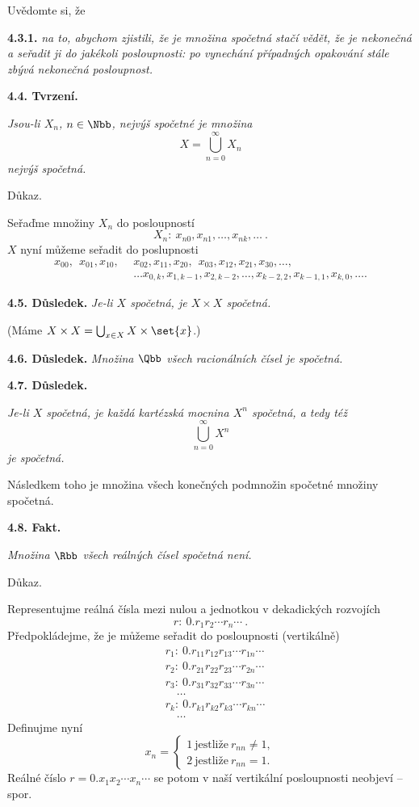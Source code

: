 \documentclass[12pt]{article}
\begin{document}
Uvědomte si, že
 
 {\bf 4.3.1.} {\em na to, abychom zjistili, že je množina spočetná stačí vědět, že je nekonečná a seřadit ji do jakékoli posloupnosti: po vynechání případných opakování stále zbývá nekonečná posloupnost.}
 
 \bigskip
 
 {\bf 4.4. Tvrzení.} {\em  Jsou-li $X_n$, $n\in\Nbb$, nejvýš spočetné je množina
 $$
 X=\bigcup_{n=0}^\infty X_n
 $$
nejvýš spočetná.
 
 Důkaz.} Seřaďme množiny $X_n$ do posloupností
 $$
 X_n: \ x_{n0},x_{n1},\dots,x_{nk},\dots \ .
 $$
$X$ nyní můžeme seřadit do poslupnosti
 $$
 \begin{aligned} x_{00},\ \ x_{01},x_{10},\ \ &x_{02},x_{11},x_{20},\ \ x_{03},x_{12},x_{21},x_{30},\dots,\\
 &\dots x_{0,k},x_{1,k-1},x_{2,k-2},\dots,x_{k-2,2},x_{k-1,1},x_{k,0},\dots .
 \end{aligned}
 $$
 \sq
 
 \bigskip
 
 {\bf 4.5. Důsledek.} {\em Je-li $X$ spočetná, je $X\times X$ spočetná.}
 
 (Máme $X\times X=\bigcup_{x\in X}X\times\set{x}$.)
 
 \bigskip
 
  {\bf 4.6. Důsledek.} {\em Množina $\Qbb$ všech racionálních čísel je spočetná.}
  
  \bigskip
  
   {\bf 4.7. Důsledek.} {\em Je-li $X$ spočetná, je každá  kartézská mocnina $X^n$ spočetná, a tedy též
   $$
   \bigcup_{n=0}^\infty X^n
   $$
   je spočetná.
   
   Následkem toho je množina všech konečných podmnožin spočetné množiny spočetná.}
   
   
   \bigskip
   
    {\bf 4.8. Fakt.} {\em Množina $\Rbb$ všech reálných čísel spočetná {\em není}.
    
    Důkaz.} Representujme  reálná čísla mezi nulou a jednotkou v dekadických rozvojích 
    $$
    r: \ 0.r_1r_2\cdots r_n\cdots \ .
    $$ 
	Předpokládejme, že je můžeme seřadit do posloupnosti (vertikálně)
	$$
    \begin{aligned}
    &r_1: \ 0.r_{11}r_{12}r_{13}\cdots r_{1n}\cdots \\
    &r_2: \ 0.r_{21}r_{22}r_{23}\cdots r_{2n}\cdots \\
    &r_3: \ 0.r_{31}r_{32}r_{33}\cdots r_{3n}\cdots \\
    &\quad\dots \\
    &r_k: \ 0.r_{k1}r_{k2}r_{k3}\cdots r_{kn}\cdots \\
    &\quad\dots
    \end{aligned}
    $$
    Definujme nyní
    $$
    x_n=\begin{cases} 1 \ \text{jestliže}\  r_{nn}\neq 1,\\
                     2 \ \text{jestliže} \  r_{nn}= 1. \end{cases}
   $$
   Reálné číslo $r=0.x_1x_2\cdots x_n\cdots$ se potom v naší vertikální posloupnosti neobjeví -- spor.\sq   
   
\end{document}
